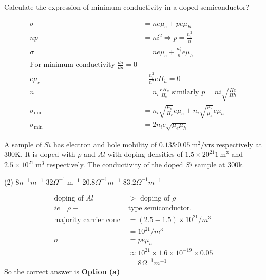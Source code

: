 \begin{exercise}
	Calculate the expression of minimum conductivity in a doped semiconductor?
\end{exercise}
\begin{answer}
	\begin{align*}
	\sigma&=n e \mu_{e}+p e \mu_{R}\\
	n p&=n i^{2} \Rightarrow p=\frac{n_{i}^{2}}{n}\\
	\sigma&=n e \mu_{e}+\frac{n_{i}^{2}}{n} e \mu_{h}\\
	\text{For minimum conductivity }\frac{d \sigma}{d n}=0\\
	e \mu_{e}&-\frac{n_{i}^{2}}{n^{2}} e H_{h}=0\\
	n&=n_{i} \frac{F H_{k}}{H_{e}}\text{ similarly }p=n i \sqrt{\frac{H e}{H h}}\\
	\sigma_{\min }&=n_{i} \sqrt{\frac{\mu_{h}}{H_{e}}} e \mu_{e}+n_{i} \sqrt{\frac{\mu_{e}}{\mu_{h}}} e \mu_{h}\\
	\sigma_{\min }&=2 n_{i} e \sqrt{\mu_{e} \mu_{h}}
	\end{align*}
\end{answer}
\begin{exercise}
	A sample of $Si$ has electron and hole mobility of $0.13 \& 0.05 \mathrm{~m}^{2} / \mathrm{vrs}$ respectively at $300 $K.  It is doped with $\rho$ and $Al$ with doping densities of $1.5 \times 20^{21} 1 \mathrm{~m}^{3}$ and $2.5 \times 10^{21} \mathrm{~m}^{3}$ respectively. The conductivity of the doped $Si$ sample at $300$k.
	 \begin{tasks}(2)
		\task[\textbf{a.}]$8 n^{-1} m^{-1}$
		\task[\textbf{b.}]$32 \Omega^{-1} \mathrm{~m}^{-1}$
		\task[\textbf{c.}]$20.8\Omega^{-1}m^{-1}$
		\task[\textbf{d.}]  $83.2 \Omega^{-1}m^{-1}$
	\end{tasks}
\end{exercise}
\begin{answer}
	\begin{align*}
	\text{doping of }Al&>\text{ doping of }\rho\\
	ie \quad\rho-&\text{type semiconductor.}\\
	\text{majority carrier conc }&=(2.5-1.5)\times10^{21}/m^3\\
	&=10^{21}/m^3\\
	\sigma &=p e \mu_{h} \\
	& \approx 10^{21} \times 1.6 \times 10^{-19} \times 0.05\\
	&=8\Omega^{-1}m^{-1}
	\end{align*}
	So the correct answer is \textbf{Option (a)}
\end{answer}
